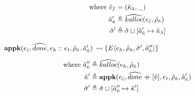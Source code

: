\documentclass[12pt,draft]{article}
\newcommand\mdoubleplus{\ensuremath{\mathbin{+\mkern-9mu+}}}
\begin{document}
\begin{multicols*}{2}
\begin{center}
\end{center}
\vspace{-7mm}
\begin{align*}
  \text{where }
  \hat{v}_f &= (\hat{\kappa}_{\lambda} , \_) \\
  \hat{a}_{\hat{\kappa}}' &\triangleq \widehat{kalloc}(e_{\hat{\varsigma}} , \hat{\rho}_{\hat{\kappa}}) \\
  \hat{\sigma}' &\triangleq \hat{\sigma} \sqcup [\hat{a}_{\hat{\kappa}}' \mapsto \hat{\kappa}_{\lambda}]
\end{align*}
\begin{center}
  $\textbf{appk}(e_{\hat{\varsigma}} , \widehat{done} , e_h::e_t , \hat{\rho}_{\hat{\kappa}} , \hat{a}_{\hat{\kappa}}')$
  $\leadsto \{E\langle e_h , \hat{\rho}_{\hat{\kappa}} , \hat{\sigma}' , \hat{a}_{\hat{\kappa}}'' \rangle\}$
\end{center}
\vspace{-7mm}
\begin{align*}
  \text{where }
  \akaddr'' &\triangleq \akalloc{e_h , \aenv_{\akont}} \\
  \akont' &\triangleq \textbf{appk}(\ectrl, \adone \mdoubleplus [\aval],
            e_t , \aenv_{\akont} , \akaddr') \\
  \astore' &\triangleq \astore \sqcup [\akaddr'' \mapsto \akont']
\end{align*}
\end{multicols*}
\end{document}
